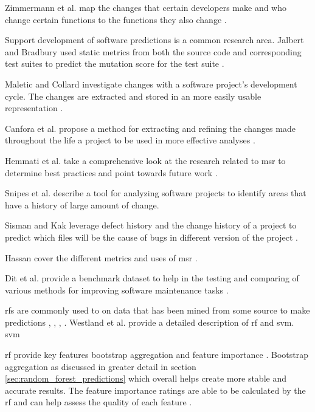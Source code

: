 Zimmermann et al. map the changes that certain developers make and who change certain functions to the functions they also change \cite{Zimmermann2005a}. 

Support development of software predictions is a common research area. Jalbert and Bradbury used static metrics from both the source code and corresponding test suites to predict the mutation score for the test suite \cite{Jalbert2012}.

Maletic and Collard investigate changes with a software project's development cycle. The changes are extracted and stored in an more easily usable representation \cite{Maletic2004}.

Canfora et al. propose a method for extracting and refining the changes made throughout the life a project to be used in more effective analyses \cite{Canfora2007c}.

Hemmati et al. take a comprehensive look at the research related to \gls{msr} to determine best practices and point towards future work \cite{Hemmati2013}.

Snipes et al. describe a tool for analyzing software projects to identify areas that have a history of large amount of change.

Sisman and Kak leverage defect history and the change history of a project to predict which files will be the cause of bugs in different version of the project \cite{Sisman2012}.

Hassan cover the different metrics and uses of \gls{msr} \cite{Hassan2006}.

Dit et al. provide a benchmark dataset to help in the testing and comparing of various methods for improving software maintenance tasks \cite{Dit2013}.




\gls{rf}s are commonly used to on data that has been mined from some source to make predictions \cite{Alam2013}, \cite{Granitto2007}, \cite{Stojanova}, \cite{Yu2011}. Westland et al. provide a detailed description of \gls{rf} and \gls{svm}. \gls{svm} %

\gls{rf} provide key features bootstrap aggregation and feature importance \cite{Westland2011}. Bootstrap aggregation as discussed in greater detail in section \ref{sec:random_forest_predictions} which overall helps create more stable and accurate results. The feature importance ratings are able to be calculated by the \gls{rf} and can help assess the quality of each feature \cite{Verikas2011}.






